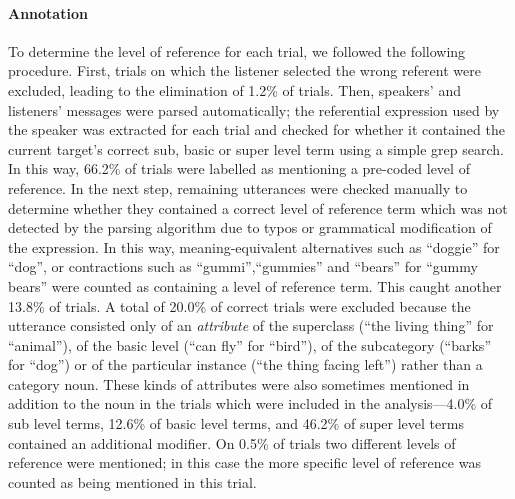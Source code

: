 \documentclass[10pt,letterpaper]{article}
\newcommand{\jd}[1]{\textcolor{Blue}{[jd: #1]}}
\begin{document}
\paragraph{\bf Annotation}
To determine the level of reference for each trial, we followed the following procedure. First, trials on which the listener selected the wrong referent were excluded, leading to the elimination of 1.2\% of trials. Then, speakers' and listeners' messages were parsed automatically; the referential expression used by the speaker was extracted for each trial and checked for whether it contained the current target's correct sub, basic or super level term using a simple grep search. In this way, 66.2\% of trials were labelled as mentioning a pre-coded level of reference. In the next step, remaining utterances were checked manually to determine whether they contained a correct level of reference term which was not detected by the parsing algorithm due to typos or grammatical modification of the expression. In this way, meaning-equivalent alternatives such as ``doggie'' for ``dog'',  or contractions such as ``gummi'',``gummies'' and ``bears'' for ``gummy bears'' were counted as containing a level of reference term. This caught another 13.8\% of trials. A total of 20.0\% of correct trials were excluded because the utterance consisted only of an \emph{attribute} of the superclass (``the living thing'' for ``animal''), of the basic level (``can fly'' for ``bird''), of the subcategory (``barks'' for ``dog'') or of the  particular instance (``the thing facing left'') rather than a category noun. These kinds of attributes were also sometimes mentioned in addition to the noun in the trials which were included in the analysis---4.0\% of sub level terms, 12.6\% of basic level terms, and 46.2\% of super level terms contained an additional modifier. 
On 0.5\% of trials two different levels of reference were mentioned; in this case the more specific level of reference was counted as being mentioned in this trial. 
\end{document}
